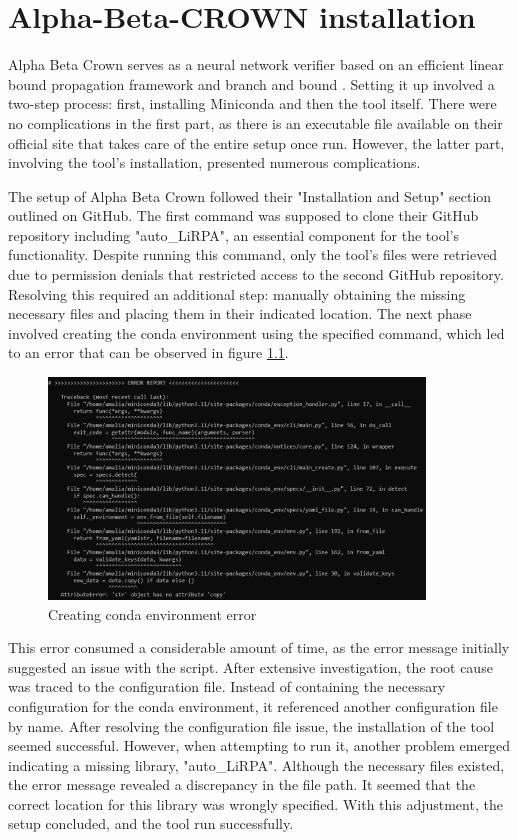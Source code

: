 \chapter{Alpha-Beta-CROWN installation}
\label{chap:ch2}


\par Alpha Beta Crown serves as a neural network verifier based on an efficient linear bound propagation framework and branch and bound \cite{abc}. Setting it up involved a two-step process: first, installing Miniconda and then the tool itself. There were no complications in the first part, as there is an executable file available on their official site that takes care of the entire setup once run. However, the latter part, involving the tool's installation, presented numerous complications.

\par The setup of Alpha Beta Crown followed their "Installation and Setup" section outlined on GitHub. The first command was supposed to clone their GitHub repository including "auto\_LiRPA", an essential component for the tool's functionality. Despite running this command, only the tool's files were retrieved due to permission denials that restricted access to the second GitHub repository. Resolving this required an additional step: manually obtaining the missing necessary files and placing them in their indicated location. The next phase involved creating the conda environment using the specified command, which led to an error that can be observed in figure \ref{Fig_Err}. 

\begin{figure}[htbp]
	\centering
		\includegraphics[width=10cm]{./Figures/ToolErr.png}
	\caption{Creating conda environment error}
	\label{Fig_Err}
\end{figure}

\par This error consumed a considerable amount of time, as the error message initially suggested an issue with the script. After extensive investigation, the root cause was traced to the configuration file. Instead of containing the necessary configuration for the conda environment, it referenced another configuration file by name. After resolving the configuration file issue, the installation of the tool seemed successful. However, when attempting to run it, another problem emerged indicating a missing library, "auto\_LiRPA". Although the necessary files existed, the error message revealed a discrepancy in the file path. It seemed that the correct location for this library was wrongly specified. With this adjustment, the setup concluded, and the tool run successfully.
 